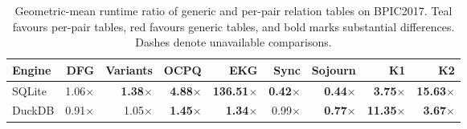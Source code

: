 \begin{table}[t]
\caption{Geometric-mean runtime ratio of generic and per-pair relation tables on BPIC2017. Teal favours per-pair tables, red favours generic tables, and bold marks substantial differences. Dashes denote unavailable comparisons.}\label{tab:typing-rels-results}
\centering
\footnotesize
\setlength{\tabcolsep}{3pt}
\renewcommand{\arraystretch}{1.15}
\begin{tabular*}{\linewidth}{@{\extracolsep{\fill}}lrrrrrrrr@{}}
\toprule
Engine & DFG & Variants & OCPQ & EKG & Sync & Sojourn & K1 & K2 \\
\midrule
SQLite & \cellcolor{teal!2}1.06$\times$ & \cellcolor{teal!8}\textbf{1.38$\times$} & \cellcolor{teal!41}\textbf{4.88$\times$} & \cellcolor{teal!55}\textbf{136.51$\times$} & \cellcolor{red!23}\textbf{0.42$\times$} & \cellcolor{red!21}\textbf{0.44$\times$} & \cellcolor{teal!34}\textbf{3.75$\times$} & \cellcolor{teal!55}\textbf{15.63$\times$} \\
DuckDB & \cellcolor{red!3}0.91$\times$ & \cellcolor{teal!1}1.05$\times$ & \cellcolor{teal!10}\textbf{1.45$\times$} & \cellcolor{teal!8}\textbf{1.34$\times$} & 0.99$\times$ & \cellcolor{red!7}\textbf{0.77$\times$} & \cellcolor{teal!55}\textbf{11.35$\times$} & \cellcolor{teal!34}\textbf{3.67$\times$} \\
\bottomrule
\end{tabular*}
\end{table}
